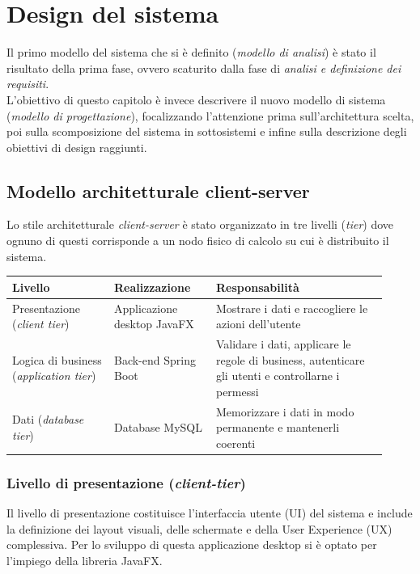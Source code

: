 \chapter{Design del sistema} %

Il primo modello del sistema che si è definito (\textit{modello di analisi}) è stato il risultato della prima fase, ovvero scaturito dalla fase di \textit{analisi e definizione dei requisiti}. \\
\indent L’obiettivo di questo capitolo è invece descrivere il nuovo modello di sistema (\textit{modello di progettazione}), focalizzando l'attenzione prima sull'architettura scelta, poi sulla scomposizione del sistema in sottosistemi e infine sulla descrizione degli obiettivi di design raggiunti.

\section{Modello architetturale client-server}

Lo stile architetturale \textit{client-server} è stato organizzato in tre 
livelli (\textit{tier}) dove ognuno di  questi corrisponde a un nodo fisico 
di calcolo su cui è distribuito il sistema.

\begin{center}
\renewcommand{\arraystretch}{1.6}
\begin{tabular}{|p{0.25\linewidth}|p{0.25\linewidth}|p{0.42\linewidth}|}
\hline
\textbf{Livello} & \textbf{Realizzazione} & \textbf{Responsabilità} \\
\hline
Presentazione (\textit{client tier}) & Applicazione desktop JavaFX & Mostrare i dati e raccogliere le azioni dell'utente \\
\hline
Logica di business (\textit{application tier}) & Back-end Spring Boot & Validare i dati, applicare le regole di business, autenticare gli utenti e controllarne i permessi \\
\hline
Dati (\textit{database tier}) & Database MySQL & Memorizzare i dati in modo permanente e mantenerli coerenti \\
\hline
\end{tabular}
\end{center}

\subsection{Livello di presentazione (\textit{client-tier})}
Il livello di presentazione costituisce l'interfaccia utente (UI) del sistema e include 
la definizione dei layout visuali, delle schermate e della User Experience 
(UX) complessiva. Per lo sviluppo di questa applicazione desktop si è optato per 
l'impiego della libreria JavaFX.

